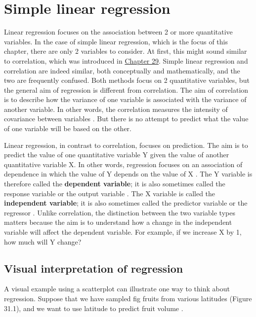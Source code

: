 \documentclass[
]{scrbook}
\begin{document}
\hypertarget{Chapter_31}{%
\chapter{Simple linear regression}\label{Chapter_31}}

Linear regression focuses on the association between 2 or more quantitative variables.
In the case of simple linear regression, which is the focus of this chapter, there are only 2 variables to consider.
At first, this might sound similar to correlation, which was introduced in \protect\hyperlink{Chapter_29}{Chapter 29}.
Simple linear regression and correlation are indeed similar, both conceptually and mathematically, and the two are frequently confused.
Both methods focus on 2 quantitative variables, but the general aim of regression is different from correlation.
The aim of correlation is to describe how the variance of one variable is associated with the variance of another variable.
In other words, the correlation measures the intensity of covariance between variables \citep{Sokal1995}.
But there is no attempt to predict what the value of one variable will be based on the other.

Linear regression, in contrast to correlation, focuses on prediction.
The aim is to predict the value of one quantitative variable Y given the value of another quantitative variable X.
In other words, regression focuses on an association of dependence in which the value of Y depends on the value of X \citep{Rahman1968}.
The Y variable is therefore called the \textbf{dependent variable}; it is also sometimes called the response variable or the output variable \citep{Box1978, Sokal1995}.
The X variable is called the \textbf{independent variable}; it is also sometimes called the predictor variable or the regressor \citep{Box1978, Sokal1995}.
Unlike correlation, the distinction between the two variable types matters because the aim is to understand how a change in the independent variable will affect the dependent variable.
For example, if we increase X by 1, how much will Y change?

\hypertarget{visual-interpretation-of-regression}{%
\section{Visual interpretation of regression}\label{visual-interpretation-of-regression}}

A visual example using a scatterplot can illustrate one way to think about regression.
Suppose that we have sampled fig fruits from various latitudes (Figure 31.1), and we want to use latitude to predict fruit volume \citep{Duthie2016}.
\end{document}
